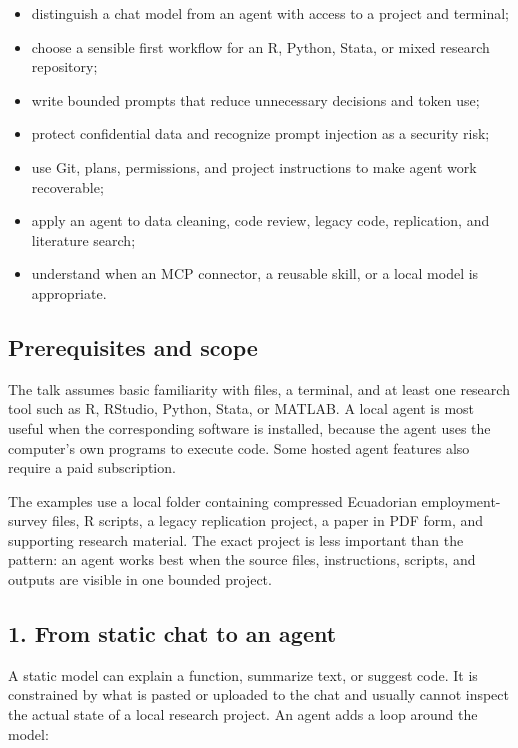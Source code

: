\documentclass[
  english,
  10pt,
]{article}
\providecommand{\tightlist}{%
  \setlength{\itemsep}{0pt}\setlength{\parskip}{0pt}}
\begin{document}
\begin{itemize}
\tightlist
\item
  distinguish a chat model from an agent with access to a project and
  terminal;
\item
  choose a sensible first workflow for an R, Python, Stata, or mixed
  research repository;
\item
  write bounded prompts that reduce unnecessary decisions and token use;
\item
  protect confidential data and recognize prompt injection as a security
  risk;
\item
  use Git, plans, permissions, and project instructions to make agent
  work recoverable;
\item
  apply an agent to data cleaning, code review, legacy code,
  replication, and literature search;
\item
  understand when an MCP connector, a reusable skill, or a local model
  is appropriate.
\end{itemize}

\subsection{Prerequisites and scope}\label{prerequisites-and-scope}

The talk assumes basic familiarity with files, a terminal, and at least
one research tool such as R, RStudio, Python, Stata, or MATLAB. A local
agent is most useful when the corresponding software is installed,
because the agent uses the computer's own programs to execute code. Some
hosted agent features also require a paid subscription.

The examples use a local folder containing compressed Ecuadorian
employment-survey files, R scripts, a legacy replication project, a
paper in PDF form, and supporting research material. The exact project
is less important than the pattern: an agent works best when the source
files, instructions, scripts, and outputs are visible in one bounded
project.

\subsection{1. From static chat to an
agent}\label{from-static-chat-to-an-agent}

A static model can explain a function, summarize text, or suggest code.
It is constrained by what is pasted or uploaded to the chat and usually
cannot inspect the actual state of a local research project. An agent
adds a loop around the model:
\end{document}
